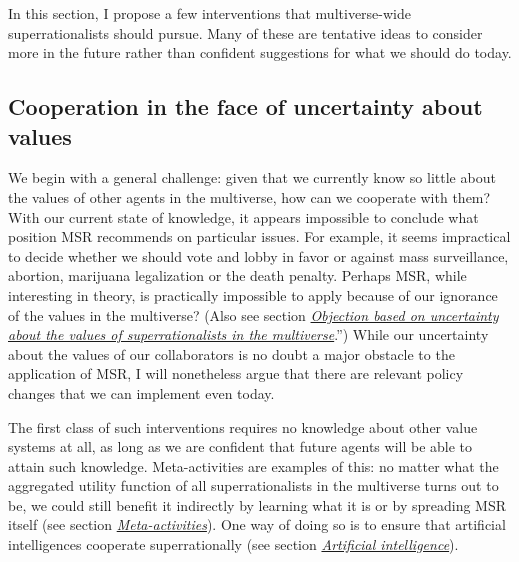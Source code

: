 In this section, I propose a few interventions that multiverse-wide
superrationalists should pursue. Many of these are tentative ideas to
consider more in the future rather than confident suggestions for what
we should do today.

\hypertarget{cooperation-in-the-face-of-uncertainty-about-values}{\subsection{Cooperation
in the face of uncertainty about
values}\label{cooperation-in-the-face-of-uncertainty-about-values}}

We begin with a general challenge: given that we currently know so
little about the values of other agents in the multiverse, how can we
cooperate with them? With our current state of knowledge, it appears
impossible to conclude what position MSR recommends on particular
issues. For example, it seems impractical to decide whether we should
vote and lobby in favor or against mass surveillance, abortion,
marijuana legalization or the death penalty. Perhaps MSR, while
interesting in theory, is practically impossible to apply because of our
ignorance of the values in the multiverse? (Also see section
\protect\hyperlink{objection-based-on-uncertainty-about-the-values-of-superrationalists-in-the-multiverse}{\emph{Objection
based on uncertainty about the values of superrationalists in the
multiverse}}.'') While our uncertainty about the values of our
collaborators is no doubt a major obstacle to the application of MSR, I
will nonetheless argue that there are relevant policy changes that we
can implement even today.

The first class of such interventions requires no knowledge about other
value systems at all, as long as we are confident that future agents
will be able to attain such knowledge. Meta-activities are examples of
this: no matter what the aggregated utility function of all
superrationalists in the multiverse turns out to be, we could still
benefit it indirectly by learning what it is or by spreading MSR itself
(see section
\protect\hyperlink{meta-activities}{\emph{Meta-activities}}). One
way of doing so is to ensure that artificial intelligences cooperate
superrationally (see section
\protect\hyperlink{artificial-intelligence}{\emph{Artificial
intelligence}}).

